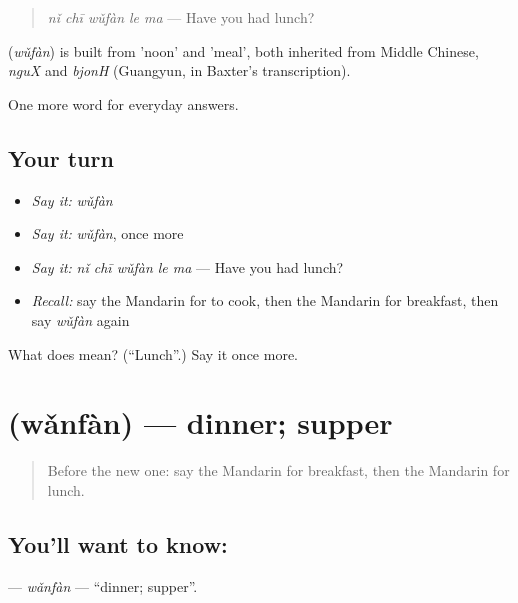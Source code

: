 \begin{quote}
\textbf{} \emph{nǐ chī wǔfàn le ma} — Have you had lunch?
\end{quote}

\begin{cousinweb}
\textbf{} (\emph{wǔfàn}) is built from  'noon' and  'meal', both inherited from Middle Chinese, \emph{nguX} and \emph{bjonH} (Guangyun, in Baxter's transcription).
\end{cousinweb}

\begin{grammarlens}[title={What you've built}]
One more word for everyday answers.
\end{grammarlens}

\subsection*{Your turn}
\begin{itemize}
\raggedright
  \item \emph{Say it:} \emph{wǔfàn}
  \item \emph{Say it:} \emph{wǔfàn}, once more
  \item \emph{Say it:} \emph{nǐ chī wǔfàn le ma} — Have you had lunch?
  \item \emph{Recall:} say the Mandarin for to cook, then the Mandarin for breakfast, then say \emph{wǔfàn} again
\end{itemize}

\begin{tcolorbox}[breakable,colback=teal!4,colframe=teal!35!black,title={Before you move on}]
What does  mean? (\textquotedblleft{}Lunch\textquotedblright{}.) Say it once more.
\end{tcolorbox}
\section[\texorpdfstring{\zh{晚饭} (wǎnfàn)}{晚饭 (wǎnfàn)}]{ (wǎnfàn) — dinner; supper}

\label{lesson:ZH-C69-wanfan}



\begin{quote}
Before the new one: say the Mandarin for breakfast, then the Mandarin for lunch.
\end{quote}

\subsection*{You'll want to know: }
\textbf{} — \emph{wǎnfàn} — \textquotedblleft{}dinner; supper\textquotedblright{}.

